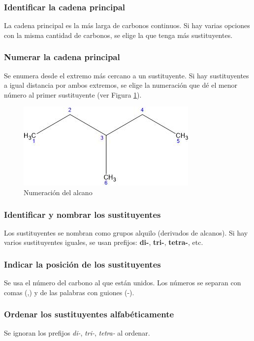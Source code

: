 \documentclass{article}
\begin{document}
\subsubsection{Identificar la cadena principal}
La cadena principal es la más larga de carbonos continuos. Si hay varias opciones con la misma cantidad de carbonos, se elige la que tenga más sustituyentes.

\subsubsection{Numerar la cadena principal}
Se enumera desde el extremo más cercano a un sustituyente. Si hay sustituyentes a igual distancia por ambos extremos, se elige la numeración que dé el menor número al primer sustituyente (ver Figura \ref{fig:numeracion_alcano}).
\begin{figure}[h]
    \centering
    \includegraphics[width=0.5\linewidth]{media/numeracion 3-metilpentano.jpg}
    \caption{Numeración del alcano}
    \label{fig:numeracion_alcano}
\end{figure}

\subsubsection{Identificar y nombrar los sustituyentes}
Los sustituyentes se nombran como grupos alquilo (derivados de alcanos). Si hay varios sustituyentes iguales, se usan prefijos: \textbf{di-}, \textbf{tri-}, \textbf{tetra-}, etc.

\subsubsection{Indicar la posición de los sustituyentes}
Se usa el número del carbono al que están unidos. Los números se separan con comas (,) y de las palabras con guiones (-).

\subsubsection{Ordenar los sustituyentes alfabéticamente}
Se ignoran los prefijos \textit{di-}, \textit{tri-}, \textit{tetra-} al ordenar.
\end{document}
